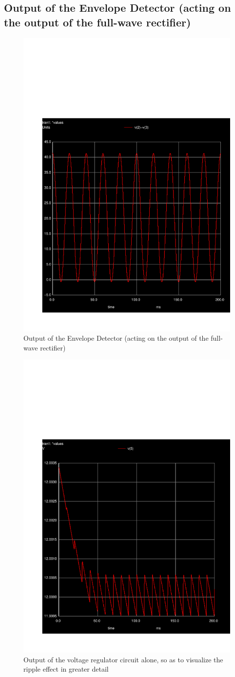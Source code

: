 \subsection{Output of the Envelope Detector (acting on the output of the full-wave rectifier)}

\par
\begin{figure}[H] \centering
\includegraphics[width=0.6\linewidth]{vrect.pdf}
\caption{Output of the Envelope Detector (acting on the output of the full-wave rectifier)}
\label{fig:env}
\end{figure}



\par
\begin{figure}[H] \centering
\includegraphics[width=0.6\linewidth]{vout.pdf}
\caption{Output of the voltage regulator circuit alone, so as to visualize the ripple effect in greater detail}
\label{fig:vout}
\end{figure}

